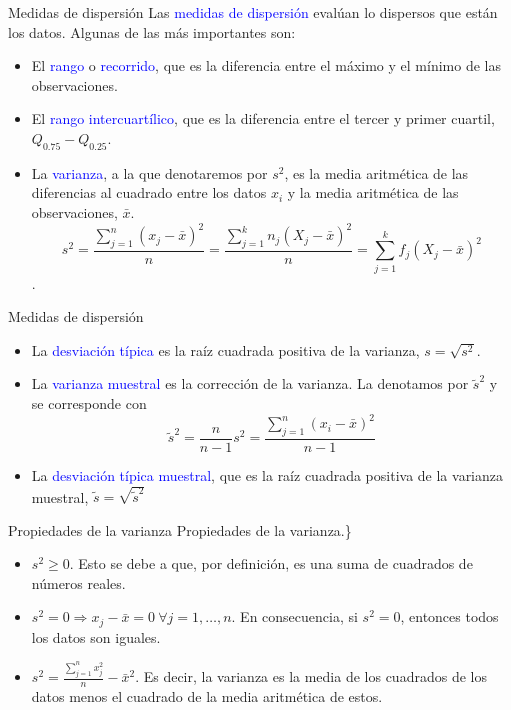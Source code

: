 \documentclass[
  ignorenonframetext,
  aspectratio=169]{beamer}
\providecommand{\tightlist}{%
  \setlength{\itemsep}{0pt}\setlength{\parskip}{0pt}}
\newcommand\blue[1]{\textcolor{blue}{#1}}
\begin{document}
\begin{frame}{Medidas de dispersión}
\label{medidas-de-dispersiuxf3n}
Las \blue{medidas de dispersión} evalúan lo dispersos que están los
datos. Algunas de las más importantes son:

\begin{itemize}
\item
  El \blue{rango} o \blue{recorrido}, que es la diferencia entre el
  máximo y el mínimo de las observaciones.
\item
  El \blue{rango intercuartílico}, que es la diferencia entre el tercer
  y primer cuartil, \(Q_{0.75}-Q_{0.25}\).
\item
  La \blue{varianza}, a la que denotaremos por \(s^2\), es la media
  aritmética de las diferencias al cuadrado entre los datos \(x_i\) y la
  media aritmética de las observaciones, \(\bar{x}\).
  \[s^2 = \frac{\sum_{j=1}^n(x_j-\bar{x})^2}{n}=\frac{\sum_{j=1}^kn_j(X_j-\bar{x})^2}{n}=\sum_{j=1}^kf_j(X_j-\bar{x})^2\].
\end{itemize}
\end{frame}

\begin{frame}{Medidas de dispersión}
\label{medidas-de-dispersiuxf3n-1}
\begin{itemize}
\item
  La \blue{desviación típica} es la raíz cuadrada positiva de la
  varianza, \(s=\sqrt{s^2}\).
\item
  La \blue{varianza muestral} es la corrección de la varianza. La
  denotamos por \(\tilde{s}^2\) y se corresponde con
  \[\tilde{s}^2 = \frac{n}{n-1}s^2 = \frac{\sum_{j=1}^n(x_i-\bar{x})^2}{n-1}\]
\item
  La \blue{desviación típica muestral}, que es la raíz cuadrada positiva
  de la varianza muestral, \(\tilde{s} = \sqrt{\tilde{s}^2}\)
\end{itemize}
\end{frame}

\begin{frame}{Propiedades de la varianza}
\label{propiedades-de-la-varianza}
Propiedades de la varianza.\}

\begin{itemize}
\tightlist
\item
  \(s^2\ge 0\). Esto se debe a que, por definición, es una suma de
  cuadrados de números reales.
\item
  \(s^2 = 0\Longrightarrow x_j-\bar{x}=0\ \forall j= 1,\dots,n\). En
  consecuencia, si \(s^2=0\), entonces todos los datos son iguales.
\item
  \(s^2 =\frac{\sum_{j=1}^nx_j^2}{n}-\bar{x}^2\). Es decir, la varianza
  es la media de los cuadrados de los datos menos el cuadrado de la
  media aritmética de estos.
\end{itemize}
\end{frame}
\end{document}
